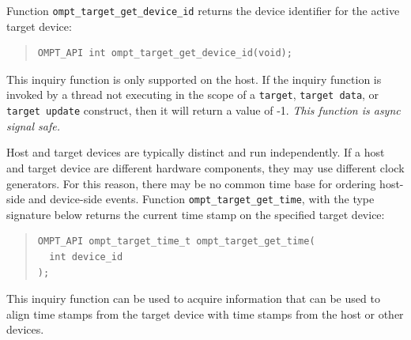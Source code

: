 \documentclass{article}
\begin{document}

Function \verb|ompt_target_get_device_id| returns the device identifier for the active target device:
\begin{quote}
\begin{verbatim}
OMPT_API int ompt_target_get_device_id(void);
\end{verbatim}
\end{quote}
This inquiry function is only supported on the host. If the inquiry function is invoked by a thread not executing in the scope of a {\tt target}, {\tt target data}, or {\tt target update} construct, then it will return a value of -1. {\it This function is async signal safe.}

Host and target devices are typically distinct and run independently. If a
host and target device are different hardware components, they may 
use different clock generators. For this reason,  there may be no common time base for ordering host-side and device-side events.
Function \verb|ompt_target_get_time|, with the type signature below returns the current time stamp on the specified target device:
\begin{quote}
\begin{verbatim}
OMPT_API ompt_target_time_t ompt_target_get_time(
  int device_id
);
\end{verbatim}
\end{quote}
This inquiry function can be used
to acquire information that can be used to align time stamps from the target device with time
stamps from the host or other devices.
\end{document}
